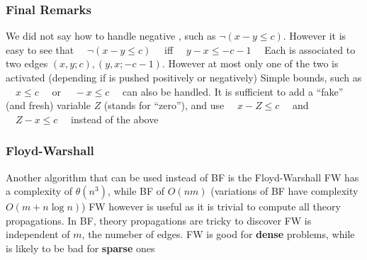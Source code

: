 \begin{frame}
  \frametitle{Final Remarks}

  We did not say how to handle negative \tatoms, such as $\neg( x - y \leq c )$.
  However it is easy to see that  $\quad\neg( x - y \leq c )\quad$ iff $\quad y  - x \leq - c - 1\quad$
  \vfill
  Each \tatom is associated to two edges $(x,y;c), (y,x;-c-1)$. However
  at most only one of the two is activated (depending if \tatom is pushed positively or
  negatively)
  \vfill
  \pause
  Simple bounds, such as $\quad x \leq c\quad$ or $\quad - x \leq c\quad$ can also be handled. It is
  sufficient to add a ``fake'' (and fresh) variable $Z$ (stands for ``zero''),
  and use $\quad x - Z \leq c\quad$ and $\quad Z - x \leq c\quad$ instead of the above

\end{frame}

\begin{frame}
  \frametitle{Floyd-Warshall}

  Another algorithm that can be used instead of BF is the
  Floyd-Warshall
  \vfill
  FW has a complexity of $\theta(n^3)$, while BF of $O(nm)$
  (variations of BF have complexity $O(m + n \log n)$)
  \vfill
  FW however is useful as it is trivial to compute all
  theory propagations. In BF, theory propagations are tricky
  to discover
  \vfill
  FW is independent of $m$, the numeber of edges. FW is good
  for {\bf dense} problems, while is likely to be bad for
  {\bf sparse} ones

\end{frame}

